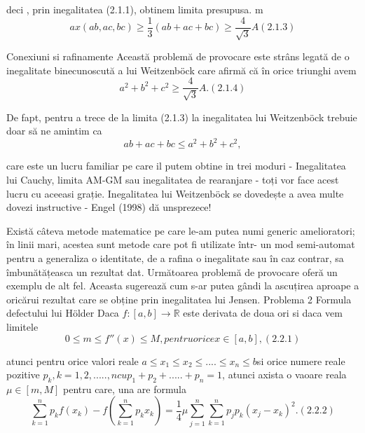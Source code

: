 \documentclass[a4paper,12pt,oneside]{report}
\begin{document}
deci , prin inegalitatea (2.1.1), obtinem limita presupusa. 
m\begin{displaymath}
  ax \left ( ab, ac, bc \right )\geq \frac{1}{3}\left ( ab + ac + bc \right )\geq \frac{4}{\sqrt{3}}A ( 2.1.3) 
\end{displaymath}

Conexiuni si rafinamente 
Această problemă de provocare este strâns legată de o inegalitate binecunoscută a lui Weitzenböck care afirmă că în orice triunghi avem 
\begin{displaymath}
  a^{2} + b^{2} + c^{2} \geq \frac{4}{\sqrt{3}}A . (2.1.4)
\end{displaymath}

De fapt, pentru a trece de la limita (2.1.3) la inegalitatea lui Weitzenböck trebuie doar să ne amintim ca 
\begin{displaymath}
  ab + ac + bc \leq a^{2} + b^{2} + c^{2}, 
\end{displaymath}

care este un lucru familiar pe care il putem obtine in trei moduri  - Inegalitatea lui Cauchy, limita AM-GM sau inegalitatea de rearanjare -  toți vor face acest lucru cu aceeasi grație.
	Inegalitatea lui Weitzenböck se dovedește a avea multe dovezi instructive - Engel (1998) dă unsprezece! 

Există câteva metode matematice pe care le-am putea numi generic amelioratori; în linii mari, acestea sunt metode care pot fi utilizate într- un mod semi-automat pentru a generaliza o identitate, de a rafina o inegalitate sau în caz contrar, sa îmbunătățeasca un rezultat dat. 
Următoarea problemă de provocare oferă un exemplu de alt fel. Aceasta sugerează cum s-ar putea gândi la ascuțirea aproape a oricărui rezultat care se obține prin inegalitatea lui Jensen.
Problema 2
Formula defectului lui Hölder
Daca \(f : \left [ a,b  \right ] \to \mathbb{R}\) este derivata de doua ori si daca vem limitele 
\begin{displaymath}
  0 \leq m \leq  f''\left ( x \right ) \leq  M , pentru orice x\in \left [ a,b \right ], (2.2.1)
\end{displaymath}

atunci pentru orice valori reale \(a\leq x_{1}\leq x_{2}\leq ....\leq x_{n} \leq b \)si orice numere reale pozitive \(p_{k}, k= 1,2,.....,n  cu p_{1} + p_{2} + .....+ p_{n} = 1\), atunci axista o vaoare reala \(\mu \in \left [ m, M \right ]\) pentru care, una are formula
\begin{displaymath}
  \sum_{k = 1}^{n}p_{k}f\left ( x_{k} \right ) - f\left ( \sum_{k = 1}^{n} p_{k}x_{k}\right ) = \frac{1}{4}\mu \sum_{j = 1}^{n}\sum_{k = 1}^{n}p_{j}p_{k}\left ( x_{j} - x_{k} \right )^{2}. ( 2.2.2)
\end{displaymath}
\end{document}
